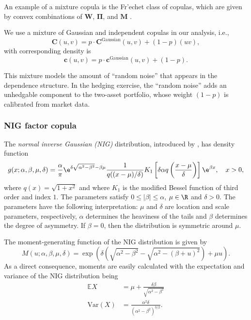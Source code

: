 An example of a mixture copula is the Fr'echet class of copulas, which are given by convex combinations of $\bm{W}$,
  $\bm{\Pi}$, and $\bm{M}$ \citep{Nelsen1999}. \medskip

We use a mixture of Gaussian and independent copulas in our analysis,
i.e., 
\begin{equation*}
  \bm{C}(u,v) = p\cdot \bm{C}^\text{Gaussian}(u,v) + (1-p)(uv),
\end{equation*}
with corresponding density is
\begin{equation*}
  \bm{c}(u,v) = p\cdot \bm{c}^\text{Gaussian}(u,v) + (1-p).
\end{equation*}

This mixture models the amount of ``random noise'' that appears in the
dependence structure. In the hedging exercise, the
``random noise'' adds an unhedgable component to the two-asset portfolio, whose weight $(1-p)$ is calibrated from market data.

\subsubsection{NIG factor copula}

The {\em normal inverse Gaussian (NIG)\/} distribution, introduced by
\citep{BarndorffNielsen1997}, has density function
\begin{equation*}
  g(x; \alpha,\beta, \mu, \delta) = \frac{\alpha}{\pi} \e^{\delta
    \sqrt{\alpha^2-\beta^2} -\beta\mu} \frac{1}{q((x-\mu)/\delta)}
  K_1\left[\delta \alpha q\left(\frac{x-\mu}{\delta}\right) \right]
  \e^{\beta x},\quad x>0,
\end{equation*}
where $q(x) = \sqrt{1+x^2}$ and where $K_1$ is the modified Bessel
function of third order and index $1$. The parameters satisfy $0\leq
|\beta|\leq \alpha$, $\mu\in \R$ and $\delta>0$. The parameters have
the following interpretation: $\mu$ and $\delta$ are location and
scale parameters, respectively, $\alpha$ determines the heaviness of
the tails and $\beta$ determines the degree of asymmetry. If
$\beta=0$, then the distribution is symmetric around $\mu$.

The moment-generating function of the NIG distribution is given by
\begin{equation*}
  M(u; \alpha, \beta, \mu, \delta) = \exp\left( \delta
    \left(\sqrt{\alpha^2-\beta^2} - \sqrt{\alpha^2 - (\beta +
        u)^2}\right) + \mu u\right). 
\end{equation*}
As a direct consequence, moments are easily calculated with the
expectation and variance of the NIG distribution being
\begin{align}
  \label{eq:4}
  \mathbb E X &= \mu + 
                \frac{\delta \beta}{\sqrt{\alpha^2-\beta^2}}\\
  \label{eq:5}
  \text{Var}(X) &= \frac{\alpha^2\delta}{(\alpha^2-\beta^2)^{3/2}}.
\end{align}


